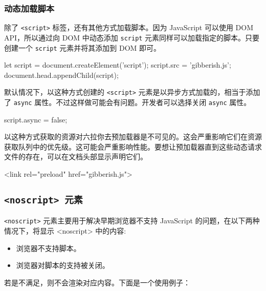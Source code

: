 \subsubsection{动态加载脚本}

除了 \texttt{<script>} 标签，还有其他方式加载脚本。因为 JavaScript 可以使用 DOM API，所以通过向 DOM 中动态添加 \texttt{script} 元素同样可以加载指定的脚本。只要创建一个 \texttt{script} 元素并将其添加到 DOM 即可。

\begin{JavaScript}
let script = document.createElement('script');
script.src = 'gibberish.js';
document.head.appendChild(script);
\end{JavaScript}

默认情况下，以这种方式创建的 \texttt{<script>} 元素是以异步方式加载的，相当于添加了 \texttt{async} 属性。不过这样做可能会有问题。开发者可以选择关闭 \texttt{async} 属性。

\begin{JavaScript}
script.async = false;
\end{JavaScript}

以这种方式获取的资源对六拉你去预加载器是不可见的。这会严重影响它们在资源获取队列中的优先级。这可能会严重影响性能。要想让预加载器直到这些动态请求文件的存在，可以在文档头部显示声明它们。

\begin{HTML}
<link rel="preload" href="gibberish.js">
\end{HTML}

\subsection{\texttt{<noscript> 元素}}

\texttt{<noscript>} 元素主要用于解决早期浏览器不支持 JavaScript 的问题，在以下两种情况下，将显示 <noscript> 中的内容:

\begin{itemize}
    \item 浏览器不支持脚本。
    \item 浏览器对脚本的支持被关闭。
\end{itemize}

若是不满足，则不会渲染对应内容。下面是一个使用例子：



\newpage